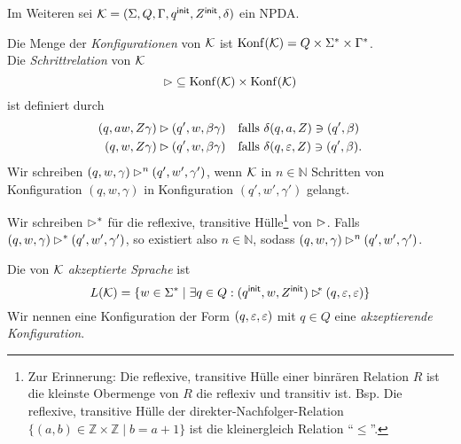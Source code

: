 Im Weiteren sei $\mathcal{K}=(\Sigma,Q,\Gamma,q^\mathsf{init},Z^\mathsf{init},\delta)$ ein \ac{NPDA}.
\begin{Def}[name={[Menge der Konfigurationen eines \acs*{NPDA}]}]
        Die Menge der \emph{Konfigurationen} von $\mathcal{K}$ ist $\operatorname{Konf}(\mathcal{K}) = Q\times\Sigma^*\times\Gamma^*$.\\
        Die \emph{Schrittrelation} von $\mathcal{K}$
  \begin{displaymath}
    \mathop{\rhd} \subseteq \operatorname{Konf}(\mathcal{K}) \times \operatorname{Konf}(\mathcal{K}) 
  \end{displaymath}
  ist definiert durch
        \begin{align*}
                (q,aw,Z\gamma) &\rhd (q',w,\beta\gamma) &&\text{falls }\delta(q,a,Z)\ni(q',\beta)\\
                (q,w,Z\gamma) &\rhd (q',w,\beta\gamma) &&\text{falls }\delta(q,\varepsilon,Z)\ni(q',\beta).
        \end{align*}
  Wir schreiben $(q,w,\gamma) \rhd^n (q',w',\gamma')$, wenn $\mathcal{K}$ in $n \in \mathbb{N}$ Schritten von Konfiguration $(q,w,\gamma)$ in Konfiguration $(q',w',\gamma')$ gelangt.

  Wir schreiben ${\rhd^*}$ für die reflexive, transitive Hülle\footnote{
  Zur Erinnerung: Die reflexive, transitive Hülle einer binrären Relation $R$ 
  ist die kleinste Obermenge von $R$ die reflexiv und transitiv ist.
  Bsp.  Die reflexive, transitive Hülle der direkter-Nachfolger-Relation 
  $\{(a,b)\in\mathbb{Z}\times\mathbb{Z}\mid b = a + 1\}$
  ist die kleinergleich Relation ``$\leq$''.
  }
  von ${\rhd}$.
  Falls $(q,w,\gamma) \rhd^* (q',w',\gamma')$, so existiert also $n \in \mathbb{N}$, sodass $(q,w,\gamma) \rhd^n (q',w',\gamma')$.
  
        Die von $\mathcal{K}$ \emph{akzeptierte Sprache} ist
  \begin{displaymath}
                L(\mathcal{K}) = \{ w\in\Sigma^* \mid \exists q\in Q: (q^\mathsf{init},w,Z^\mathsf{init}) \rhd^{\!\!*} (q,\varepsilon,\varepsilon) \}
  \end{displaymath}
  Wir nennen eine Konfiguration der Form $(q,\varepsilon,\varepsilon)$ mit $q\in Q$ eine \emph{akzeptierende Konfiguration}.
\end{Def}

